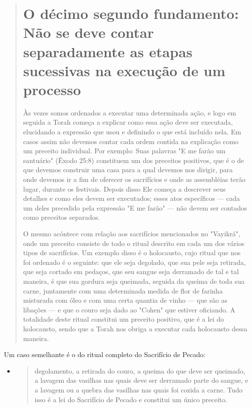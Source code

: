 \begin{quote}

\chapter{O décimo segundo fundamento: Não se deve contar separadamente as etapas sucessivas na execução de um processo}

Às vezes somos ordenados a executar uma determinada ação, e lo­go em
seguida a Torah começa a explicar como essa ação deve ser executada,
elucidando a expressão que usou e definindo o que está incluído nela. Em
casos assim não devemos contar cada ordem contida na explicação como um
preceito individual. Por exemplo: Suas palavras "E me farão um
santuário" (Êxodo 25:8) constituem um dos preceitos positivos, que é o
de que devemos construir uma casa para a qual devemos nos dirigir, para
onde devemos ir a fim de oferecer os sacrifícios e onde as assembléias
terão lugar, durante os festivais. Depois disso Ele começa a descrever
seus detalhes e como eles devem ser executados; esses atos específicos
--- cada um deles precedido pela expressão "E me farão" --- não devem
ser contados como preceitos separados.

O mesmo acóntece com relação aos sacrifícios mencionados no "Va­yikrá",
onde um preceito consiste de todo o ritual descrito em cada um dos
vários tipos de sacrifícios. Um exemplo disso é o holocausto, cujo
ritual que nos foi ordenado é o seguinte: que ele seja degolado, que sua
pele seja retirada, que seja cortado em pedaços, que seu sangue seja
derramado de tal e tal manei­ra, é que sua gordura seja queimada,
seguida da queima de toda sua carne, jun­tamente com uma determinada
medida de flor de farinha misturada com óleo e com uma certa quantia de
vinho --- que são as libações --- e que o couro seja dado ao "Cohen" que
estiver oficiando. A totalidade deste ritual constitui um preceito
positivo, que é a lei do holocausto, sendo que a Torah nos obriga a
executar cada holocausto dessa maneira.
\end{quote}

Um caso semelhante é o do ritual completo do Sacrifício de Pecado:

\begin{itemize}
\item
 \begin{quote}
 degolamento, a retirada do couro, a queima do que deve ser queimado, a
 lavagem das vasilhas nas quais deve ser derramado parte do sangue, e a
 lava­gem ou a quebra das vasilhas nas quais foi cozida a carne. Tudo
 isso é a lei do Sacrifício de Pecado e constitui um único preceito.
 \end{quote}
\end{itemize}

